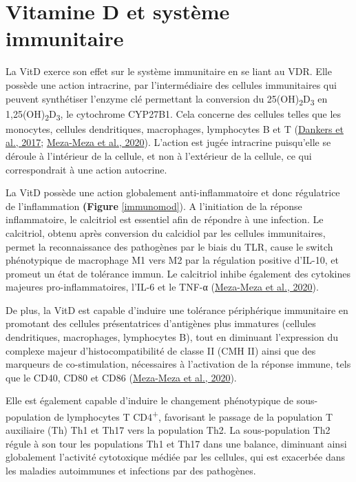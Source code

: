 \documentclass[
  letterpaper,
  DIV=11,
  numbers=noendperiod]{scrartcl}
\begin{document}
\hypertarget{vitamine-d-et-systuxe8me-immunitaire}{%
\section{Vitamine D et système
immunitaire}\label{vitamine-d-et-systuxe8me-immunitaire}}

La VitD exerce son effet sur le système immunitaire en se liant au VDR.
Elle possède une action intracrine, par l'intermédiaire des cellules
immunitaires qui peuvent synthétiser l'enzyme clé permettant la
conversion du 25(OH)\textsubscript{2}D\textsubscript{3} en
1,25(OH)\textsubscript{2}D\textsubscript{3}, le cytochrome CYP27B1. Cela
concerne des cellules telles que les monocytes, cellules dendritiques,
macrophages, lymphocytes B et T
(\protect\hyperlink{ref-Dankers.2017}{Dankers et al., 2017};
\protect\hyperlink{ref-Meza-Meza.2020}{Meza-Meza et al., 2020}).
L'action est jugée intracrine puisqu'elle se déroule à l'intérieur de la
cellule, et non à l'extérieur de la cellule, ce qui correspondrait à une
action autocrine.

La VitD possède une action globalement anti-inflammatoire et donc
régulatrice de l'inflammation \textbf{(Figure} \ref{immunomod}). A
l'initiation de la réponse inflammatoire, le calcitriol est essentiel
afin de répondre à une infection. Le calcitriol, obtenu après conversion
du calcidiol par les cellules immunitaires, permet la reconnaissance des
pathogènes par le biais du TLR, cause le switch phénotypique de
macrophage M1 vers M2 par la régulation positive d'IL-10, et promeut un
état de tolérance immun. Le calcitriol inhibe également des cytokines
majeures pro-inflammatoires, l'IL-6 et le TNF-α
(\protect\hyperlink{ref-Meza-Meza.2020}{Meza-Meza et al., 2020}).

De plus, la VitD est capable d'induire une tolérance périphérique
immunitaire en promotant des cellules présentatrices d'antigènes plus
immatures (cellules dendritiques, macrophages, lymphocytes B), tout en
diminuant l'expression du complexe majeur d'histocompatibilité de classe
II (CMH II) ainsi que des marqueurs de co-stimulation, nécessaires à
l'activation de la réponse immune, tels que le CD40, CD80 et CD86
(\protect\hyperlink{ref-Meza-Meza.2020}{Meza-Meza et al., 2020}).

Elle est également capable d'induire le changement phénotypique de
sous-population de lymphocytes T CD4\textsuperscript{+}, favorisant le
passage de la population T auxiliaire (Th) Th1 et Th17 vers la
population Th2. La sous-population Th2 régule à son tour les populations
Th1 et Th17 dans une balance, diminuant ainsi globalement l'activité
cytotoxique médiée par les cellules, qui est exacerbée dans les maladies
autoimmunes et infections par des pathogènes.
\end{document}

